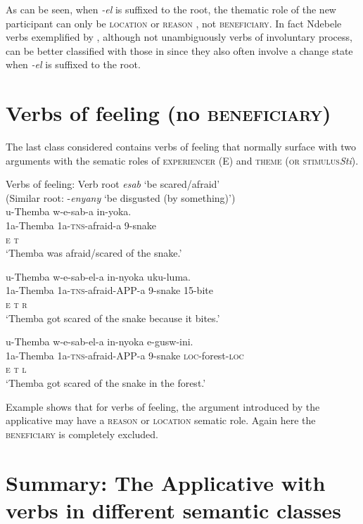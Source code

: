 \documentclass[output=paper]{langsci/langscibook}
\begin{document}
As can be seen, when \textit{-el} is suffixed to the root, the thematic role of the new participant can only be \textsc{location } or \textsc{reason }, not \textsc{beneficiary}. In fact Ndebele verbs exemplified by , although not unambiguously verbs of involuntary process, can be better classified with those in  since they also often involve a change state when \textit{-el} is suffixed to the root.

\section{Verbs of feeling (no \textsc{beneficiary)}}

The last class considered contains verbs of feeling that normally surface with two arguments with the sematic roles of \textsc{experiencer} (E) and \textsc{theme }(\textsc{or stimulus}\textit {Sti}). 

\ea
{Verbs of feeling: Verb root \textit{esab} ‘be scared/afraid’}\\
 (Similar root: -\textit{enyany} ‘be disgusted (by something)’)\\
\ea
\gll u-Themba w-e-sab-a in-yoka. \\
 1a-Themba 1a-\textsc{tns}-afraid-a 9-snake\\
 \textsc{e t }\\
\glt ‘Themba was afraid/scared of the snake.’

\ex
\gll u-Themba w-e-sab-el-a in-nyoka uku-luma. \\
 1a-Themba 1a-\textsc{tns}-afraid-APP-a 9-snake 15-bite\\
 \textsc{e t r}\\
\glt ‘Themba got scared of the snake because it bites.’

\ex
\gll u-Themba w-e-sab-el-a in-nyoka e-gusw-ini. \\
 1a-Themba 1a-\textsc{tns}-afraid-APP-a 9-snake \textsc{loc}-forest-\textsc{loc}\\
 \textsc{e t l}\\
\glt ‘Themba got scared of the snake in the forest.’
\z
\z

Example  shows that for verbs of feeling, the argument introduced by the applicative may have a \textsc{reason} or \textsc{location} sematic role. Again here the \textsc{beneficiary} is completely excluded. 

\section{Summary: The Applicative with verbs in different semantic classes}
\end{document}
